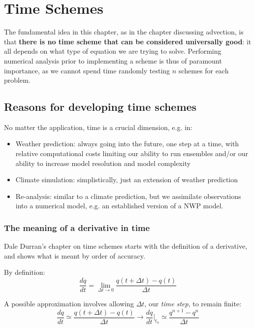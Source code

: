 \chapter{Time Schemes}

The fundamental idea in this chapter, as in the chapter discussing advection, is that {\bf there is no time scheme that can be considered universally good}: it all depends on what type of equation we are trying to solve. Performing numerical analysis prior to implementing a scheme is thus of paramount importance, as we cannot spend time randomly testing $n$ schemes for each problem.

\section{Reasons for developing time schemes}

No matter the application, time is a crucial dimension, e.g. in:
\begin{itemize}
	\item Weather prediction: always going into the future, one step at a time, with relative computational costs limiting our ability to run ensembles and/or our ability to increase model resolution and model complexity
	\item Climate simulation: simplistically, just an extension of weather prediction
	\item Re-analysis: similar to a climate prediction, but we assimilate observations into a numerical model, e.g. an established version of a NWP model.
\end{itemize}

\subsection{The meaning of a derivative in time}

Dale Durran's chapter on time schemes starts with the definition of a derivative, and shows what is meant by order of accuracy.

By definition:
\begin{equation}
	\frac{dq}{dt} = \lim_{\Delta t \to 0}  \frac{q(t+\Delta t)-q(t)}{\Delta t}
\end{equation}

A possible approximation involves allowing $\Delta t$, our \emph{time step}, to remain finite:
\begin{equation}
	\frac{dq}{dt} \simeq  \frac{q(t+\Delta t)-q(t)}{\Delta t} \to 	\frac{dq}{dt}\bigg|_{t_n} \simeq \frac{q^{n+1}-q^n}{\Delta t}
\end{equation}

